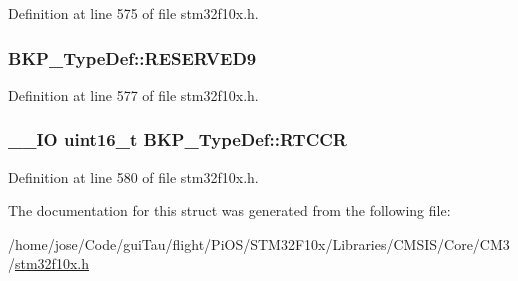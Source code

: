 Definition at line 575 of file stm32f10x.\-h.

\hypertarget{struct_b_k_p___type_def_a9efc1ff7c68b6adbe832ad858f7ab4f5}{
\subsubsection[{R\-E\-S\-E\-R\-V\-E\-D9}]{ B\-K\-P\-\_\-\-Type\-Def\-::\-R\-E\-S\-E\-R\-V\-E\-D9}}\label{struct_b_k_p___type_def_a9efc1ff7c68b6adbe832ad858f7ab4f5}


Definition at line 577 of file stm32f10x.\-h.

\hypertarget{struct_b_k_p___type_def_a4f876006771eb447cb9a8bbb18a7aa10}{
\subsubsection[{R\-T\-C\-C\-R}]{\setlength{\rightskip}{0pt plus 5cm}\-\_\-\-\_\-\-I\-O {\bf uint16\-\_\-t} B\-K\-P\-\_\-\-Type\-Def\-::\-R\-T\-C\-C\-R}}\label{struct_b_k_p___type_def_a4f876006771eb447cb9a8bbb18a7aa10}


Definition at line 580 of file stm32f10x.\-h.



The documentation for this struct was generated from the following file\-:\begin{DoxyCompactItemize}
\item 
/home/jose/\-Code/gui\-Tau/flight/\-Pi\-O\-S/\-S\-T\-M32\-F10x/\-Libraries/\-C\-M\-S\-I\-S/\-Core/\-C\-M3/\hyperlink{stm32f10x_8h}{stm32f10x.\-h}\end{DoxyCompactItemize}
